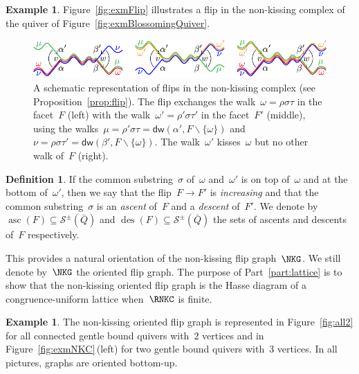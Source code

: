 \documentclass{amsart}
\theoremstyle{definition}
\newtheorem{definition}[theorem]{Definition}
\newtheorem{example}[theorem]{Example}
\newcommand{\ssm}{\smallsetminus} %
\DeclareMathOperator{\ascents}{asc} %
\DeclareMathOperator{\descents}{des} %
\newcommand{\fref}[1]{Figure~\ref{#1}} %
\newcommand{\darkblue}{\color{darkblue}} %
\newcommand{\defn}[1]{\textsl{\darkblue #1}} %
\newcommand{\strings}{\mathcal{S}} %
\newcommand{\distinguishedWalk}[2]{\mathsf{dw}(#1,#2)} %
\begin{document}
\begin{example}
\fref{fig:exmFlip} illustrates a flip in the non-kissing complex of the quiver of \fref{fig:exmBlossomingQuiver}.

\begin{figure}[t]
	\capstart
	\centerline{\includegraphics[scale=1]{flip}}
	\caption{A schematic representation of flips in the non-kissing complex (see Proposition~\ref{prop:flip}). The flip exchanges the walk~$\omega = \rho \sigma \tau$ in the facet~$F$ (left) with the walk~$\omega' = \rho' \sigma \tau'$ in the facet~$F'$ (middle), using the walks~$\mu = \rho' \sigma \tau = \distinguishedWalk{\alpha'}{F \ssm \{\omega\}}$ and~$\nu = \rho \sigma \tau' = \distinguishedWalk{\beta'}{F \ssm \{\omega\}}$. The walk~$\omega'$ kisses~$\omega$ but no other walk of~$F$ (right).}
	\label{fig:flip}
\end{figure}
\end{example}


\begin{definition}
\label{def:increasingFlip}
\enlargethispage{.3cm}
If the common substring~$\sigma$ of~$\omega$ and~$\omega'$ is on top of~$\omega$ and at the bottom of~$\omega'$, then we say that the flip~$F \to F'$ is \defn{increasing} and that the common substring~$\sigma$ is an \defn{ascent} of~$F$ and a \defn{descent} of~$F'$.
We denote by~$\ascents(F) \subseteq \strings^\pm(\bar Q)$ and $\descents(F) \subseteq \strings^\pm(\bar Q)$ the sets of ascents and descents of~$F$ respectively.
\end{definition}

This provides a natural orientation of the non-kissing flip graph~$\NKG$.
We still denote by~$\NKG$ the oriented flip graph.
The purpose of Part~\ref{part:lattice} is to show that the non-kissing oriented flip graph is the Hasse diagram of a congruence-uniform lattice when~$\RNKC$ is finite.

\begin{example}
The non-kissing oriented flip graph is represented in \fref{fig:all2} for all connected gentle bound quivers with~$2$ vertices and in \fref{fig:exmNKC}\,(left) for two gentle bound quivers with~$3$ vertices.
In all pictures, graphs are oriented bottom-up.
\end{example}
\end{document}
